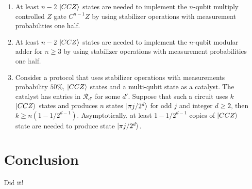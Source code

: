 \documentclass[12pt]{dalthesis}
\begin{document}
\begin{enumerate}
\item At least $n-2$ $\ket{CCZ}$ states are needed to implement the $n$-qubit multiply controlled $Z$ gate $C^{n-1}Z$ by using stabilizer operations with measurement probabilities one half.

\item At least $n-2$ $\ket{CCZ}$ states are needed to implement the $n$-qubit modular adder for $n \geq 3$ by using stabilizer operations with measurement probabilities one half.


\item Consider a protocol that uses stabilizer operations with measurements probability $50 \% $, $\ket{CCZ}$ states and a multi-qubit state as a catalyst. The catalyst has entries in $\mathcal{R}_{d'}$ for some $d'$. Suppose that such a circuit uses $k$ $\ket{CCZ}$ states and produces $n$ states $\ket{\pi j/2^d}$ for odd $j$ and integer $d \geq 2$, then $k \geq n(1-1/2^{d-1})$. Asymptotically, at least $1 - 1/2^{d-1}$ copies of $\ket{CCZ}$ state are needed to produce state $\ket{\pi j/2^d}$.
\end{enumerate}
\chapter{Conclusion}

Did it!



\end{document}

